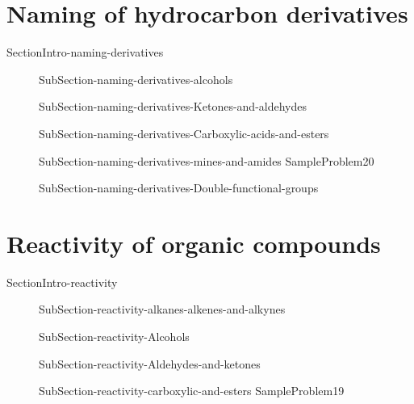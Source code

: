 \documentclass[main.tex]{subfiles}
\newcommand\chapterlabel{Ch-orgo}\setcounter{figurenewcounter}{0}\setcounter{tablenewcounter}{0}\setcounter{formulanewcounter}{0}
\begin{document}
{ \section{Naming of hydrocarbon derivatives}{SectionIntro-naming-derivatives}
\sloppy\begin{description}
\item[] {SubSection-naming-derivatives-alcohols}
\item[] {SubSection-naming-derivatives-Ketones-and-aldehydes}
\item[] {SubSection-naming-derivatives-Carboxylic-acids-and-esters}
\item[] {SubSection-naming-derivatives-mines-and-amides}
 {SampleProblem20}
 \item[] {SubSection-naming-derivatives-Double-functional-groups}

 \end{description}
 
 
\section{Reactivity of organic compounds}{SectionIntro-reactivity}
\sloppy\begin{description}
\item[] {SubSection-reactivity-alkanes-alkenes-and-alkynes}
\item[] {SubSection-reactivity-Alcohols}
 \item[] {SubSection-reactivity-Aldehydes-and-ketones}
 \item[] {SubSection-reactivity-carboxylic-and-esters}
  {SampleProblem19}
 \end{description}
 
 }
 
 
\checkoddpage\ifoddpage \clearpage\thispagestyle{empty}\mbox{}\clearpage \else  \fi 
\end{document}
